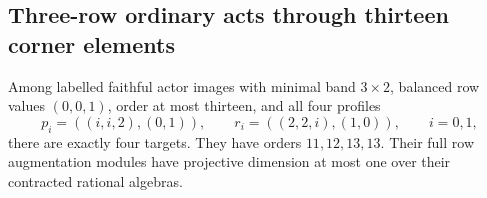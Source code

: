 \subsection{Three-row ordinary acts through thirteen corner elements}

\begin{proposition}
\label{CP2:A-forced-three-row-hulls-thirteen}
Among labelled faithful actor images with minimal band $3\times2$,
balanced row values $(0,0,1)$, order at most thirteen, and all four
profiles
\[
 p_i=((i,i,2),(0,1)),\qquad
 r_i=((2,2,i),(1,0)),\qquad i=0,1,
\]
there are exactly four targets. They have orders $11,12,13,13$.
Their full row augmentation modules have projective dimension
at most one over their contracted rational algebras.
\end{proposition}
